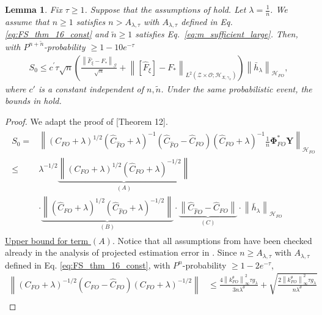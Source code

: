 \documentclass[11pt]{article}
\newcommand{\stageonesamples}{\tilde{n}}
\newcommand{\calZ}{\mathcal{Z}}
\newcommand{\calG}{\mathcal{G}}
\newcommand{\calO}{\mathcal{O}}
\newcommand{\0}{\mathbf{0}}
\newtheorem{lem}{Lemma}[section]
\begin{document}
\begin{appendix}
\begin{lem}\label{lem:thm12_meunier}
Fix $\tau\geq 1$. Suppose that the assumptions of  hold. Let $\lambda = \frac{1}{n}$. We assume that $n\geq 1$ satisfies $n> A_{\lambda,\tau}$ with $A_{\lambda,\tau}$ defined in Eq. \eqref{eq:FS_thm_16_const} and $\stageonesamples \geq 1$ satisfies Eq.~\eqref{eq:m_sufficient_large}. Then, with $P^{n+\stageonesamples}$-probability $\geq 1-10e^{-\tau}$
    \begin{align*}
        S_0 \leq c^{\prime} \tau\sqrt{n}\left(\frac{\left\|\hat{F}_{\xi} -F_\ast \right\|_{\calG}}{\sqrt{n}}+\left\| \left[\hat{F}_{\xi}\right] - F_\ast \right\|_{L^2\left(\calZ\times\calO; \mathcal{H}_{X,\gamma_x}\right)}\right)\left\|\bar{h}_\lambda\right\|_{\mathcal{H}_{FO}},
    \end{align*}
    where $c'$ is a constant independent of $n,\tilde{n}$. Under the same probabilistic event, the bounds in  hold. 
\end{lem}
\begin{proof}
We adapt the proof of \citet{meunier2024nonparametricinstrumentalregressionkernel}[Theorem 12]. 
\begin{align*}
\begin{aligned}
S_0
= & \left\|\left(C_{FO}+\lambda \right)^{1 / 2}\left(\hat{C}_{\hat{F}O}+\lambda \right)^{-1}\left(\hat{C}_{\hat{F}O}-\hat{C}_{FO}\right)\left(\hat{C}_{FO}+\lambda \right)^{-1} \frac{1}{n} \boldsymbol{\Phi}_{FO}^\ast \boldsymbol{Y} \right\|_{\mathcal{H}_{FO}} \\
\leq & \lambda^{-1 / 2} \underbrace{\left\|\left(C_{FO}+\lambda \right)^{1 / 2}\left(\hat{C}_{FO}+\lambda \right)^{-1 / 2}\right\|}_{(A)} \\
&\cdot \underbrace{\left\|\left(\hat{C}_{FO}+\lambda \right)^{1 / 2}\left(\hat{C}_{\hat{F} O}+\lambda \right)^{-1 / 2}\right\|}_{(B)} \cdot \underbrace{\left\|\hat{C}_{\hat{F}O}-\hat{C}_{FO}\right\|}_{(C)} \cdot \left\|\bar{h}_\lambda\right\|_{\mathcal{H}_{FO}}
\end{aligned}
\end{align*}
\underline{Upper bound for term $(A)$}. Notice that all assumptions from \citet[Lemma 17]{fischer2020sobolev} have been checked already in the analysis of projected estimation error in .
Since $n\geq A_{\lambda,\tau}$ with $A_{\lambda,\tau}$ defined in Eq. \eqref{eq:FS_thm_16_const}, with $P^n$-probability $\geq 1 - 2e^{-\tau}$,
\begin{align*}
    \left\|\left(C_{FO} +\lambda\right)^{-1 / 2}\left(C_{FO} -\hat{C}_{FO}\right) \left(C_{FO}+\lambda\right)^{-1 / 2} \right\| &\leq \frac{4\left\|k^{\theta}_{FO}\right\|_{\infty}^2 \tau g_\lambda}{3 n \lambda^\theta}+\sqrt{\frac{2\left\|k^{\theta}_{FO}\right\|_{\infty}^2 \tau g_\lambda}{n \lambda^\theta}} \\

\end{align*}
\end{proof}
\end{appendix}
\end{document}
